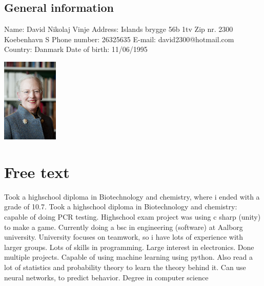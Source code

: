 \begin{center}
 \begin{minipage}[b]{0.45\textwidth} 
\subsection*{General information}
 Name: David Nikolaj Vinje \newline
 Address: Islands brygge 56b 1tv \newline
 Zip nr. 2300 Koebenhavn S \newline
 Phone number: 26325635 \newline
 E-mail: david2300@hotmail.com \newline
 Country: Danmark \newline
 Date of birth: 11/06/1995 
 \end{minipage}
 \hfill
\begin{minipage}[b]{3cm}
 \includegraphics[height=4cm]{figures/1200px-Drottning_Margrethe_av_Danmark}
 \end{minipage}
 \end{center}

\section*{Free text}
Took a highschool diploma in Biotechnology and chemistry, where i ended with a grade of 10.7.
Took a highschool diploma in Biotechnology and chemistry: capable of doing PCR testing.
Highschool exam project was using c sharp (unity) to make a game.
Currently doing a bsc in engineering (software) at Aalborg university.
University focuses on teamwork, so i have lots of experience with larger groups.
Lots of skills in programming.
Large interest in electronics. Done multiple projects.
Capable of using machine learning using python. Also read a lot of statistics and probability theory to learn the theory behind it. Can use neural networks, to predict behavior.
Degree in computer science

